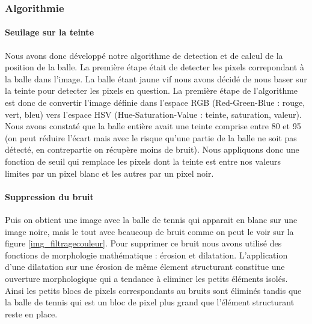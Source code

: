 
\subsubsection{Algorithmie}

\paragraph{Seuilage sur la teinte\\}

Nous avons donc développé notre algorithme de detection et de calcul de la position de la balle. La première étape était de detecter les pixels correpondant à la balle dans l'image. La balle étant jaune vif nous avons décidé de nous baser sur la teinte pour detecter les pixels en question. La première étape de l'algorithme est donc de convertir l'image définie dans l'espace RGB (Red-Green-Blue : rouge, vert, bleu) vers l'espace HSV (Hue-Saturation-Value : teinte, saturation, valeur). Nous avons constaté que la balle entière avait une teinte comprise entre 80 et 95 (on peut réduire l'écart mais avec le risque qu'une partie de la balle ne soit pas détecté, en contrepartie on récupère moins de bruit). Nous appliquons donc une fonction de seuil qui remplace les pixels dont la teinte est entre nos valeurs limites par un pixel blanc et les autres par un pixel noir.\\

\paragraph{Suppression du bruit\\}

Puis on obtient une image avec la balle de tennis qui apparait en blanc sur une image noire, mais le tout avec beaucoup de bruit comme on peut le voir sur la figure \ref{img_filtragecouleur}. Pour supprimer ce bruit nous avons utilisé des fonctions de morphologie mathématique : érosion et dilatation. L'application d'une dilatation sur une érosion de même élement structurant constitue une ouverture morphologique qui a tendance à eliminer les petits éléments isolés. Ainsi les petits blocs de pixels correspondants au bruits sont éliminés tandis que la balle de tennis qui est un bloc de pixel plus grand que l'élément structurant reste en place. \\ 

